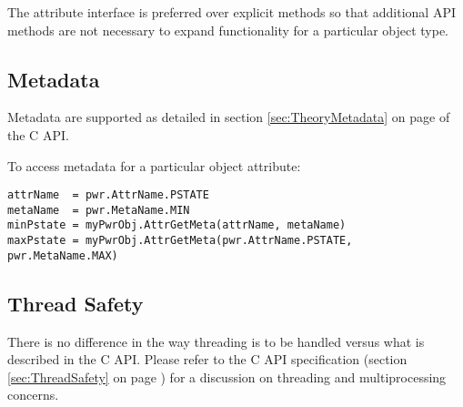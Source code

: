The attribute interface is preferred over explicit methods so that additional
API methods are not necessary to expand functionality for a particular
object type.

\subsection{Metadata}\label{sec:PythonMetadata}
Metadata are supported as detailed in section \ref{sec:TheoryMetadata} on page
\pageref{sec:TheoryMetadata} of the C API.

To access metadata for a particular object attribute:

\begin{center}\begin{minipage}{.95\linewidth}\begin{lstlisting}
attrName  = pwr.AttrName.PSTATE
metaName  = pwr.MetaName.MIN
minPstate = myPwrObj.AttrGetMeta(attrName, metaName)
maxPstate = myPwrObj.AttrGetMeta(pwr.AttrName.PSTATE, pwr.MetaName.MAX)
\end{lstlisting}\end{minipage}\end{center}

\subsection{Thread Safety}\label{sec:PythonThreadSafety}

There is no difference in the way threading is to be handled versus what is described
in the C API.
Please refer to the C API specification (section \ref{sec:ThreadSafety} on
page \pageref{sec:ThreadSafety}) for a discussion on threading and
multiprocessing concerns.
